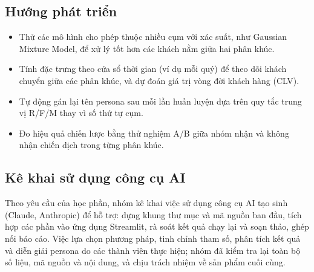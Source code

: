 \documentclass[../report.tex]{subfiles}
\begin{document}
\subsection{Hướng phát triển}

\begin{itemize}[leftmargin=1.5em]
\item Thử các mô hình cho phép thuộc nhiều cụm với xác suất, như Gaussian Mixture Model, để xử lý tốt hơn các khách nằm giữa hai phân khúc.
\item Tính đặc trưng theo cửa sổ thời gian (ví dụ mỗi quý) để theo dõi khách chuyển giữa các phân khúc, và dự đoán giá trị vòng đời khách hàng (CLV).
\item Tự động gán lại tên persona sau mỗi lần huấn luyện dựa trên quy tắc trung vị R/F/M thay vì số thứ tự cụm.
\item Đo hiệu quả chiến lược bằng thử nghiệm A/B giữa nhóm nhận và không nhận chiến dịch trong từng phân khúc.
\end{itemize}

\subsection{Kê khai sử dụng công cụ AI}

Theo yêu cầu của học phần, nhóm kê khai việc sử dụng công cụ AI tạo sinh (Claude, Anthropic) để hỗ trợ: dựng khung thư mục và mã nguồn ban đầu, tích hợp các phần vào ứng dụng Streamlit, rà soát kết quả chạy lại và soạn thảo, ghép nối báo cáo. Việc lựa chọn phương pháp, tinh chỉnh tham số, phân tích kết quả và diễn giải persona do các thành viên thực hiện; nhóm đã kiểm tra lại toàn bộ số liệu, mã nguồn và nội dung, và chịu trách nhiệm về sản phẩm cuối cùng.
\end{document}
